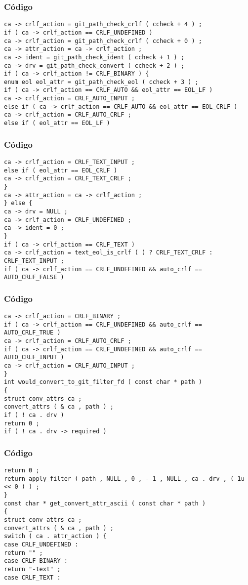 \documentclass{beamer}
\begin{document}
\begin{frame}[fragile]
\frametitle{C\'odigo}
\begin{verbatim}
ca -> crlf_action = git_path_check_crlf ( ccheck + 4 ) ; 
if ( ca -> crlf_action == CRLF_UNDEFINED ) 
ca -> crlf_action = git_path_check_crlf ( ccheck + 0 ) ; 
ca -> attr_action = ca -> crlf_action ; 
ca -> ident = git_path_check_ident ( ccheck + 1 ) ; 
ca -> drv = git_path_check_convert ( ccheck + 2 ) ; 
if ( ca -> crlf_action != CRLF_BINARY ) { 
enum eol eol_attr = git_path_check_eol ( ccheck + 3 ) ; 
if ( ca -> crlf_action == CRLF_AUTO && eol_attr == EOL_LF ) 
ca -> crlf_action = CRLF_AUTO_INPUT ; 
else if ( ca -> crlf_action == CRLF_AUTO && eol_attr == EOL_CRLF ) 
ca -> crlf_action = CRLF_AUTO_CRLF ; 
else if ( eol_attr == EOL_LF ) 
\end{verbatim}
\end{frame}
\begin{frame}[fragile]
\frametitle{C\'odigo}
\begin{verbatim}
ca -> crlf_action = CRLF_TEXT_INPUT ; 
else if ( eol_attr == EOL_CRLF ) 
ca -> crlf_action = CRLF_TEXT_CRLF ; 
} 
ca -> attr_action = ca -> crlf_action ; 
} else { 
ca -> drv = NULL ; 
ca -> crlf_action = CRLF_UNDEFINED ; 
ca -> ident = 0 ; 
} 
if ( ca -> crlf_action == CRLF_TEXT ) 
ca -> crlf_action = text_eol_is_crlf ( ) ? CRLF_TEXT_CRLF : CRLF_TEXT_INPUT ; 
if ( ca -> crlf_action == CRLF_UNDEFINED && auto_crlf == AUTO_CRLF_FALSE ) 
\end{verbatim}
\end{frame}
\begin{frame}[fragile]
\frametitle{C\'odigo}
\begin{verbatim}
ca -> crlf_action = CRLF_BINARY ; 
if ( ca -> crlf_action == CRLF_UNDEFINED && auto_crlf == AUTO_CRLF_TRUE ) 
ca -> crlf_action = CRLF_AUTO_CRLF ; 
if ( ca -> crlf_action == CRLF_UNDEFINED && auto_crlf == AUTO_CRLF_INPUT ) 
ca -> crlf_action = CRLF_AUTO_INPUT ; 
} 
int would_convert_to_git_filter_fd ( const char * path ) 
{ 
struct conv_attrs ca ; 
convert_attrs ( & ca , path ) ; 
if ( ! ca . drv ) 
return 0 ; 
if ( ! ca . drv -> required ) 
\end{verbatim}
\end{frame}
\begin{frame}[fragile]
\frametitle{C\'odigo}
\begin{verbatim}
return 0 ; 
return apply_filter ( path , NULL , 0 , - 1 , NULL , ca . drv , ( 1u << 0 ) ) ; 
} 
const char * get_convert_attr_ascii ( const char * path ) 
{ 
struct conv_attrs ca ; 
convert_attrs ( & ca , path ) ; 
switch ( ca . attr_action ) { 
case CRLF_UNDEFINED : 
return "" ; 
case CRLF_BINARY : 
return "-text" ; 
case CRLF_TEXT : 
\end{verbatim}
\end{frame}
\end{document}
